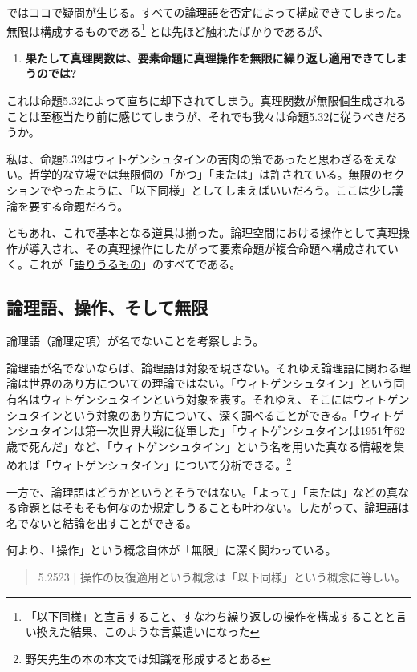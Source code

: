 \documentclass[a4paper,onecolumn,article]{jarticle}
\newcounter{ct}               %
\begin{document}
ではココで疑問が生じる。すべての論理語を否定によって構成できてしまった。無限は構成するものである\footnote{「以下同様」と宣言すること、すなわち繰り返しの操作を構成することと言い換えた結果、このような言葉遣いになった}
とは先ほど触れたばかりであるが、

\begin{enumerate}
  \item {\bf 果たして真理関数は、要素命題に真理操作を無限に繰り返し適用できてしまうのでは? }
\end{enumerate}

これは命題5.32によって直ちに却下されてしまう。真理関数が無限個生成されることは至極当たり前に感じてしまうが、それでも我々は命題5.32に従うべきだろうか。

私は、命題5.32はウィトゲンシュタインの苦肉の策であったと思わざるをえない。哲学的な立場では無限個の「かつ」「または」は許されている。無限のセクションでやったように、「以下同様」としてしまえばいいだろう。ここは少し議論を要する命題だろう。

ともあれ、これで基本となる道具は揃った。論理空間における操作として真理操作が導入され、その真理操作にしたがって要素命題が複合命題へ構成されていく。これが「\underline{語りうるもの}」のすべてである。



\subsection{論理語、操作、そして無限}

論理語（論理定項）が名でないことを考察しよう。

論理語が名でないならば、論理語は対象を現さない。それゆえ論理語に関わる理論は世界のあり方についての理論ではない。「ウィトゲンシュタイン」という固有名はウィトゲンシュタインという対象を表す。それゆえ、そこにはウィトゲンシュタインという対象のあり方について、深く調べることができる。「ウィトゲンシュタインは第一次世界大戦に従軍した」「ウィトゲンシュタインは1951年62歳で死んだ」など、「ウィトゲンシュタイン」という名を用いた真なる情報を集めれば「ウィトゲンシュタイン」について分析できる。\footnote{野矢先生の本の本文では知識を形成するとある}

一方で、論理語はどうかというとそうではない。「よって」「または」などの真なる命題とはそもそも何なのか規定しうることも叶わない。したがって、論理語は名でないと結論を出すことができる。

何より、「操作」という概念自体が「無限」に深く関わっている。

\begin{quote}
  5.2523 | 操作の反復適用という概念は「以下同様」という概念に等しい。
\end{quote}
\end{document}
